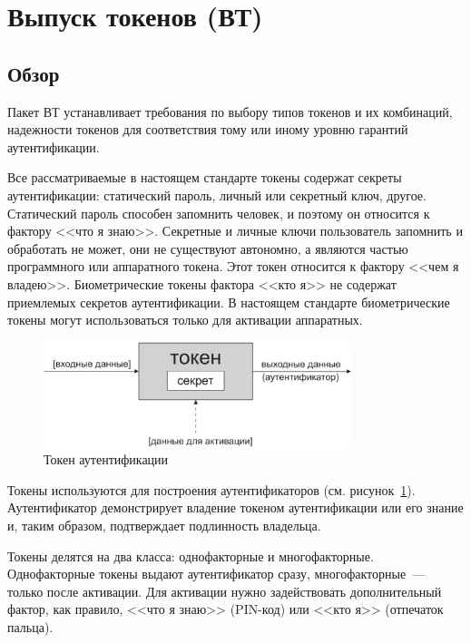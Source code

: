 \section{Выпуск токенов (ВТ)}\label{TI}

\subsection{Обзор}\label{TI.Intro}

Пакет ВТ устанавливает требования по выбору типов токенов и их комбинаций, 
надежности токенов для соответствия тому или иному уровню гарантий 
аутентификации. 

Все рассматриваемые в настоящем стандарте токены содержат секреты 
аутентификации: статический пароль, личный или секретный ключ, другое.
%
Статический пароль способен запомнить человек, и поэтому он относится 
к фактору <<что я знаю>>. Секретные и личные ключи 
пользователь запомнить и обработать не может, они не существуют автономно,
а являются частью программного или аппаратного токена. Этот 
токен относится к фактору <<чем я владею>>.
%
Биометрические токены фактора <<кто я>> не содержат приемлемых секретов 
аутентификации. В настоящем стандарте биометрические токены могут 
использоваться только для активации аппаратных. 

\begin{figure}[bht]
\begin{center}
\includegraphics[width=9cm]{../figs/Token}
\end{center}
\caption{Токен аутентификации}
\label{Fig.TI.Token}
\end{figure}

Токены используются для построения аутентификаторов (см. 
рисунок~\ref{Fig.TI.Token}). Аутентификатор демонстрирует владение 
токеном аутентификации или его знание и, таким образом, подтверждает 
подлинность владельца.

Токены делятся на два класса: однофакторные и многофакторные.
Однофакторные токены выдают аутентификатор сразу, многофакторные~---
только после активации. Для активации нужно задействовать дополнительный 
фактор, как правило, <<что я знаю>> (PIN-код) или <<кто я>> (отпечаток пальца).

